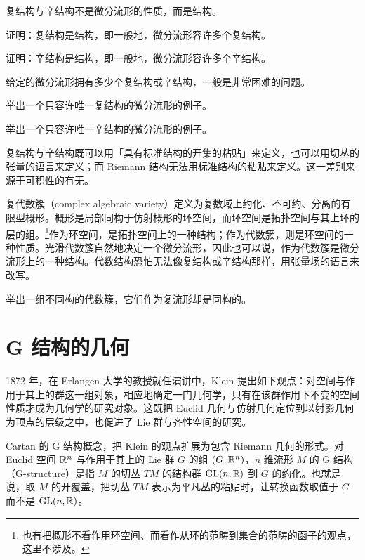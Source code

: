 复结构与辛结构不是微分流形的性质，而是结构。

\begin{exercise}
证明：复结构是结构，即一般地，微分流形容许多个复结构。
\end{exercise}

\begin{exercise}
证明：辛结构是结构，即一般地，微分流形容许多个辛结构。
\end{exercise}

给定的微分流形拥有多少个复结构或辛结构，一般是非常困难的问题。

\begin{exercise}
举出一个只容许唯一复结构的微分流形的例子。
\end{exercise}

\begin{exercise}
举出一个只容许唯一辛结构的微分流形的例子。
\end{exercise}

复结构与辛结构既可以用「具有标准结构的开集的粘贴」来定义，也可以用切丛的张量的语言来定义；而 Riemann 结构无法用标准结构的粘贴来定义。这一差别来源于可积性的有无。

复代数簇（complex algebraic variety）定义为复数域上约化、不可约、分离的有限型概形。概形是局部同构于仿射概形的环空间，而环空间是拓扑空间与其上环的层的组。\footnote{也有把概形不看作用环空间、而看作从环的范畴到集合的范畴的函子的观点，这里不涉及。}作为环空间，是拓扑空间上的一种结构；作为代数簇，则是环空间的一种性质。光滑代数簇自然地决定一个微分流形，因此也可以说，作为代数簇是微分流形上的一种结构。代数结构恐怕无法像复结构或辛结构那样，用张量场的语言来改写。

\begin{exercise}
举出一组不同构的代数簇，它们作为复流形却是同构的。
\end{exercise}

\section{G 结构的几何}

1872 年，在 Erlangen 大学的教授就任演讲中，Klein 提出如下观点：对空间与作用于其上的群这一组对象，相应地确定一门几何学，只有在该群作用下不变的空间性质才成为几何学的研究对象。这既把 Euclid 几何与仿射几何定位到以射影几何为顶点的层级之中，也促进了 Lie 群与齐性空间的研究。

Cartan 的 G 结构概念，把 Klein 的观点扩展为包含 Riemann 几何的形式。对 Euclid 空间 $\mathbb{R}^n$ 与作用于其上的 Lie 群 $G$ 的组 $(G,\mathbb{R}^n)$，$n$ 维流形 $M$ 的 G 结构（G-structure）是指 $M$ 的切丛 $TM$ 的结构群 $\mathrm{GL}(n,\mathbb{R})$ 到 $G$ 的约化。也就是说，取 $M$ 的开覆盖，把切丛 $TM$ 表示为平凡丛的粘贴时，让转换函数取值于 $G$ 而不是 $\mathrm{GL}(n,\mathbb{R})$。

